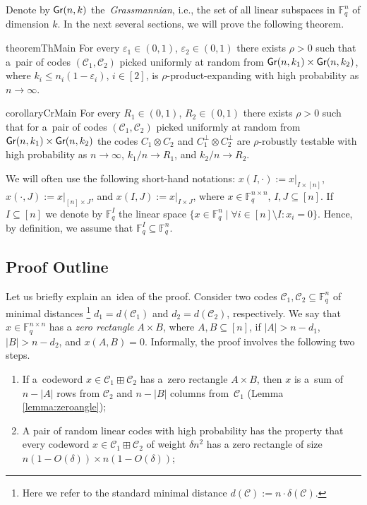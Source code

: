 \documentclass[11pt]{article}
\let\le\leqslant
\newcommand{\eps}{\varepsilon}
\theoremstyle{plain}
\theoremstyle{definition}
\theoremstyle{remark}
\newcommand{\cC}{\mathcal{C}}
\newcommand{\F}{\mathbb{F}}
\newcommand{\Gr}{{\sf Gr}}
\begin{document}
Denote by $\Gr(n,k)$ the~\emph{Grassmannian}, i.e., the set of all linear subspaces in $\F_q^n$ of dimension $k$.
In the next several sections, we will prove the following theorem. %


\begin{restatable}{theorem}{ThMain}\label{th:rand-expanding}
    For every $\eps_1\in(0,1)$, $\eps_2\in(0,1)$ there exists $\rho>0$ such that a~pair of codes $(\cC_1,\cC_2)$ picked uniformly at random from $\Gr(n,k_1)\times \Gr(n,k_2)$, where $k_i \le n_i(1-\eps_i)$, $i\in [2]$, is $\rho$-product-expanding with high probability as $n\to\infty$.
\end{restatable}


\begin{restatable}{corollary}{CrMain}\label{cr:main}
    For every $R_1\in(0,1)$, $R_2\in(0,1)$ there exists $\rho>0$ such that for a~pair of codes $(\cC_1,\cC_2)$ picked uniformly at random from $\Gr(n,k_1) \times \Gr(n,k_2)$ the codes $C_1\otimes C_2$ and $C_1^\perp\otimes C_2^\perp$ are $\rho$-robustly testable with high probability as $n\to\infty$, $k_1/n\to R_1$, and $k_2/n\to R_2$.
\end{restatable}

We will often use the following short-hand notations: $x(I,\cdot) := x|_{I \times [n]}$, $x(\cdot,J) := x|_{[n]\times J}$, and $x(I,J) := x|_{I\times J}$, where $x\in \F_q^{n\times n}$, $I,J\subseteq [n]$. If $I\subseteq [n]$ we denote by $\F_q^I$ the linear space $\{x\in \F_q^n \mid \forall i\in [n]\setminus I\colon x_i = 0 \}$. Hence, by definition, we assume that $\F_q^I \subseteq \F_q^n$.

\subsection{Proof Outline}

Let us briefly explain an~idea of the proof. Consider two codes $\cC_1, \cC_2\subseteq\F_q^n$ of minimal distances%
\footnote{Here we refer to the standard minimal distance $d(\cC) := n\cdot \delta(\cC)$.}  $d_1=d(\cC_1)$ and $d_2=d(\cC_2)$, respectively. We say that $x\in \F_q^{n\times n}$ has a \emph{zero rectangle} $A\times B$, where $A,B\subseteq [n]$, if $|A|> n-d_1$, $|B|> n-d_2$, and $x(A,B)=0$. 
Informally, the proof involves the following two steps. 
\begin{enumerate}
\item If a~codeword $x\in \cC_1\boxplus \cC_2$ has a~zero rectangle $A\times B$, then $x$ is a~sum of $n-|A|$ rows from $\cC_2$ and $n-|B|$ columns from~$\cC_1$ (Lemma \ref{lemma:zeroangle});
\item A pair of random linear codes with high probability has the property that every codeword $x\in \cC_1\boxplus \cC_2$ of weight $\delta n^2$ has a zero rectangle of size $n(1-O(\delta))\times n(1-O(\delta))$;
\end{enumerate}
\end{document}
